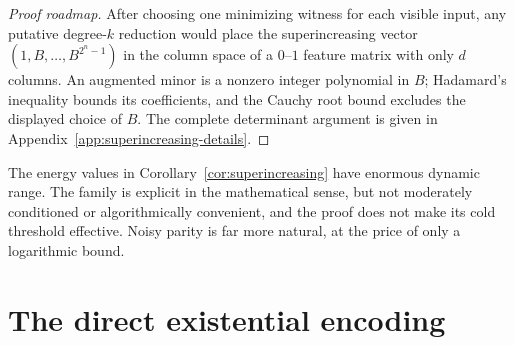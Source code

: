 \documentclass{article}
\begin{document}
\begin{proof}[Proof roadmap]
After choosing one minimizing witness for each visible input, any putative
degree-$k$ reduction would place the superincreasing vector
$(1,B,\ldots,B^{2^n-1})$ in the column space of a $0$--$1$ feature matrix with
only $d$ columns.  An augmented minor is a nonzero integer polynomial in $B$;
Hadamard's inequality bounds its coefficients, and the Cauchy root bound
excludes the displayed choice of $B$.  The complete determinant argument is
given in Appendix~\ref{app:superincreasing-details}.
\end{proof}

The energy values in Corollary~\ref{cor:superincreasing} have enormous dynamic
range.  The family is explicit in the mathematical sense, but not moderately
conditioned or algorithmically convenient, and the proof does not make its
cold threshold effective.  Noisy parity is far more natural, at the price of
only a logarithmic bound.

\section{The direct existential encoding}
\label{app:etr-encoding}
\end{document}

